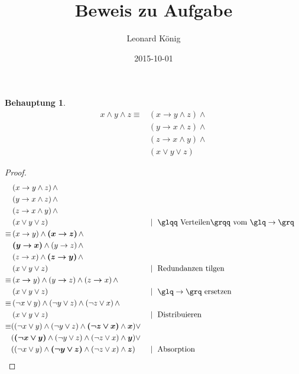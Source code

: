 \documentclass[10pt,a4paper]{article}
\author{Leonard K\"onig}
\title{Beweis zu Aufgabe}
\date{2015-10-01}
\newtheorem*{beh}{Behauptung}
\begin{document}
\begin{beh}
\begin{align*}
x \wedge y \wedge z \equiv
& \left(x \rightarrow y \wedge z\right) \wedge \\
& \left(y \rightarrow x \wedge z\right) \wedge \\
& \left(z \rightarrow x \wedge y\right) \wedge \\
& \left(x \vee y \vee z \right)
\end{align*}
\end{beh}
%
%
\begin{proof}
\begin{align}
& \left(x \rightarrow y \wedge z\right) \wedge \notag\\
& \left(y \rightarrow x \wedge z\right) \wedge \notag\\
& \left(z \rightarrow x \wedge y\right) \wedge \notag\\
& \left(x \vee y \vee z \right) && \mid\text{ \glqq Verteilen\grqq\ vom \glq}\rightarrow\text{\grq}\\
\equiv
%
& \left(x \rightarrow y\right) \wedge \bm{\left(x \rightarrow z\right)} \wedge \notag\\
& \bm{\left(y \rightarrow x\right)} \wedge \left(y \rightarrow z\right) \wedge \notag\\
& \left(z \rightarrow x\right) \wedge  \bm{\left(z \rightarrow y\right)} \wedge \notag\\
& \left(x \vee y \vee z \right) && \mid\text{ Redundanzen tilgen}\\
\equiv
%
& \left(x  \bm{\rightarrow} y\right) \wedge
\left(y  \bm{\rightarrow} z\right) \wedge
\left(z  \bm{\rightarrow} x\right) \wedge \notag\\
& \left(x \vee y \vee z \right) && \mid\text{ \glq}\rightarrow\text{\grq\ ersetzen}\\
\equiv
%
& \left(\neg x \vee y\right) \wedge
\left(\neg y \vee z\right) \wedge
\left(\neg z \vee x\right) \wedge \notag\\
& \left(x \vee y \vee z\right) && \mid\text{ Distribuieren}\\
\equiv
%
%
& (\left(\neg x \vee y\right) \wedge \left(\neg y \vee z\right) \wedge  \bm{\left(\neg z \vee x\right)} \wedge \bm{x}) \vee \notag\\
& ( \bm{\left(\neg x \vee y\right)} \wedge \left(\neg y \vee z\right) \wedge \left(\neg z \vee x\right) \wedge  \bm{y}) \vee \notag\\
& (\left(\neg x \vee y\right) \wedge  \bm{\left(\neg y \vee z\right)} \wedge \left(\neg z \vee x\right) \wedge \bm{z}) && \mid\text{ Absorption}\\

\end{align}
\end{proof}
\end{document}
